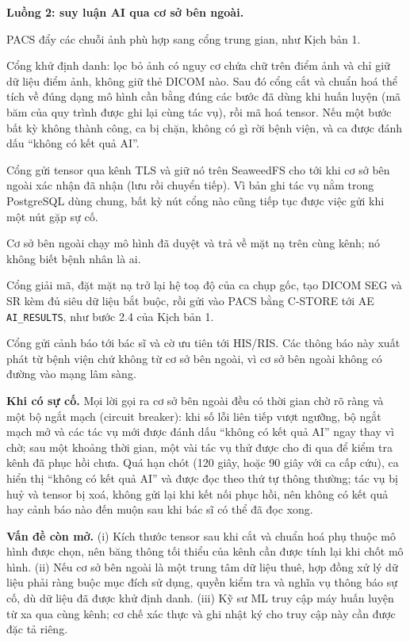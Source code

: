 \textbf{Luồng 2: suy luận AI qua cơ sở bên ngoài.}
\begin{description}[leftmargin=1.2cm,style=nextline]
\item[2.1] PACS đẩy các chuỗi ảnh phù hợp sang cổng trung gian, như Kịch bản 1.
\item[2.2] Cổng khử định danh: lọc bỏ ảnh có nguy cơ chứa chữ trên điểm ảnh và chỉ giữ dữ liệu điểm ảnh, không giữ thẻ DICOM nào. Sau đó cổng cắt và chuẩn hoá thể tích
      về đúng dạng mô hình cần bằng đúng các bước đã dùng khi huấn luyện (mã băm của quy
      trình được ghi lại cùng tác vụ), rồi mã hoá tensor. Nếu một bước bất kỳ không thành
      công, ca bị chặn, không có gì rời bệnh viện, và ca được đánh dấu ``không có kết quả
      AI''.
\item[2.3] Cổng gửi tensor qua kênh TLS và giữ nó trên SeaweedFS cho tới khi cơ sở bên
      ngoài xác nhận đã nhận (lưu rồi chuyển tiếp). Vì bản ghi tác vụ nằm trong PostgreSQL
      dùng chung, bất kỳ nút cổng nào cũng tiếp tục được việc gửi khi một nút gặp sự cố.
\item[2.4] Cơ sở bên ngoài chạy mô hình đã duyệt và trả về mặt nạ trên cùng kênh; nó
      không biết bệnh nhân là ai.
\item[2.5] Cổng giải mã, đặt mặt nạ trở lại hệ toạ độ của ca chụp gốc, tạo DICOM SEG và
      SR kèm đủ siêu dữ liệu bắt buộc, rồi gửi vào PACS bằng C-STORE tới AE
      \texttt{AI\_RESULTS}, như bước 2.4 của Kịch bản 1.
\item[2.6] Cổng gửi cảnh báo tới bác sĩ và cờ ưu tiên tới HIS/RIS. Các thông báo này
      xuất phát từ bệnh viện chứ không từ cơ sở bên ngoài, vì cơ sở bên ngoài không có
      đường vào mạng lâm sàng.
\end{description}

\textbf{Khi có sự cố.} Mọi lời gọi ra cơ sở bên ngoài đều có thời gian chờ rõ ràng và
một bộ ngắt mạch (circuit breaker): khi số lỗi liên tiếp vượt ngưỡng, bộ ngắt mạch mở và
các tác vụ mới được đánh dấu ``không có kết quả AI'' ngay thay vì chờ; sau một khoảng thời
gian, một vài tác vụ thử được cho đi qua để kiểm tra kênh đã phục hồi chưa. Quá hạn chót
(120 giây, hoặc 90 giây với ca cấp cứu), ca hiển thị ``không có kết quả AI'' và được đọc
theo thứ tự thông thường; tác vụ bị huỷ và tensor bị xoá, không gửi lại khi kết nối phục
hồi, nên không có kết quả hay cảnh báo nào đến muộn sau khi bác sĩ có thể đã đọc xong.

\textbf{Vấn đề còn mở.} (i) Kích thước tensor sau khi cắt và chuẩn hoá phụ thuộc mô hình
được chọn, nên băng thông tối thiểu của kênh cần được tính lại khi chốt mô hình. (ii) Nếu
cơ sở bên ngoài là một trung tâm dữ liệu thuê, hợp đồng xử lý dữ liệu phải ràng buộc mục
đích sử dụng, quyền kiểm tra và nghĩa vụ thông báo sự cố, dù dữ liệu đã được khử định danh.
(iii) Kỹ sư ML truy cập máy huấn luyện từ xa qua cùng kênh; cơ chế xác thực và ghi nhật ký
cho truy cập này cần được đặc tả riêng.

